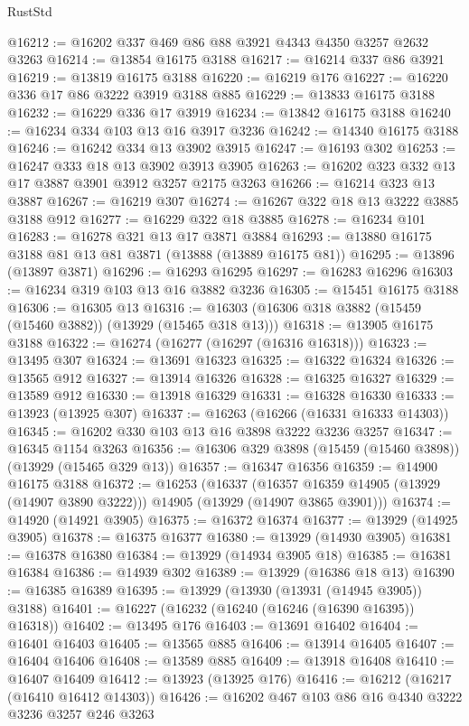 \begin{lexlean}{RustStd}
\begin{coremodule}
{\begin{coremodule}
{{{{{{{{{{{{{{{{{{{{{{{{{{{{{{{{{{{{{@16212 := @16202 @337 @469 @86 @88 @3921 @4343 @4350 @3257 @2632 @3263
@16214 := @13854 @16175 @3188
@16217 := @16214 @337 @86 @3921
@16219 := @13819 @16175 @3188
@16220 := @16219 @176
@16227 := @16220 @336 @17 @86 @3222 @3919 @3188 @885
@16229 := @13833 @16175 @3188
@16232 := @16229 @336 @17 @3919
@16234 := @13842 @16175 @3188
@16240 := @16234 @334 @103 @13 @16 @3917 @3236
@16242 := @14340 @16175 @3188
@16246 := @16242 @334 @13 @3902 @3915
@16247 := @16193 @302
@16253 := @16247 @333 @18 @13 @3902 @3913 @3905
@16263 := @16202 @323 @332 @13 @17 @3887 @3901 @3912 @3257 @2175 @3263
@16266 := @16214 @323 @13 @3887
@16267 := @16219 @307
@16274 := @16267 @322 @18 @13 @3222 @3885 @3188 @912
@16277 := @16229 @322 @18 @3885
@16278 := @16234 @101
@16283 := @16278 @321 @13 @17 @3871 @3884
@16293 := @13880 @16175 @3188 @81 @13 @81 @3871 (@13888 (@13889 @16175 @81))
@16295 := @13896 (@13897 @3871)
@16296 := @16293 @16295
@16297 := @16283 @16296
@16303 := @16234 @319 @103 @13 @16 @3882 @3236
@16305 := @15451 @16175 @3188
@16306 := @16305 @13
@16316 := @16303 (@16306 @318 @3882 (@15459 (@15460 @3882)) (@13929 (@15465 @318 @13)))
@16318 := @13905 @16175 @3188
@16322 := @16274 (@16277 (@16297 (@16316 @16318)))
@16323 := @13495 @307
@16324 := @13691 @16323
@16325 := @16322 @16324
@16326 := @13565 @912
@16327 := @13914 @16326
@16328 := @16325 @16327
@16329 := @13589 @912
@16330 := @13918 @16329
@16331 := @16328 @16330
@16333 := @13923 (@13925 @307)
@16337 := @16263 (@16266 (@16331 @16333 @14303))
@16345 := @16202 @330 @103 @13 @16 @3898 @3222 @3236 @3257
@16347 := @16345 @1154 @3263
@16356 := @16306 @329 @3898 (@15459 (@15460 @3898)) (@13929 (@15465 @329 @13))
@16357 := @16347 @16356
@16359 := @14900 @16175 @3188
@16372 := @16253
    (@16337
      (@16357 @16359 @14905 (@13929 (@14907 @3890 @3222)))
      @14905
      (@13929 (@14907 @3865 @3901)))
@16374 := @14920 (@14921 @3905)
@16375 := @16372 @16374
@16377 := @13929 (@14925 @3905)
@16378 := @16375 @16377
@16380 := @13929 (@14930 @3905)
@16381 := @16378 @16380
@16384 := @13929 (@14934 @3905 @18)
@16385 := @16381 @16384
@16386 := @14939 @302
@16389 := @13929 (@16386 @18 @13)
@16390 := @16385 @16389
@16395 := @13929 (@13930 (@13931 (@14945 @3905)) @3188)
@16401 := @16227 (@16232 (@16240 (@16246 (@16390 @16395)) @16318))
@16402 := @13495 @176
@16403 := @13691 @16402
@16404 := @16401 @16403
@16405 := @13565 @885
@16406 := @13914 @16405
@16407 := @16404 @16406
@16408 := @13589 @885
@16409 := @13918 @16408
@16410 := @16407 @16409
@16412 := @13923 (@13925 @176)
@16416 := @16212 (@16217 (@16410 @16412 @14303))
@16426 := @16202 @467 @103 @86 @16 @4340 @3222 @3236 @3257 @246 @3263
}}}}}}}}}}}}}}}}}}}}}}}}}}}}}}}}}}}}}
\end{coremodule}}
\end{coremodule}
\end{lexlean}

